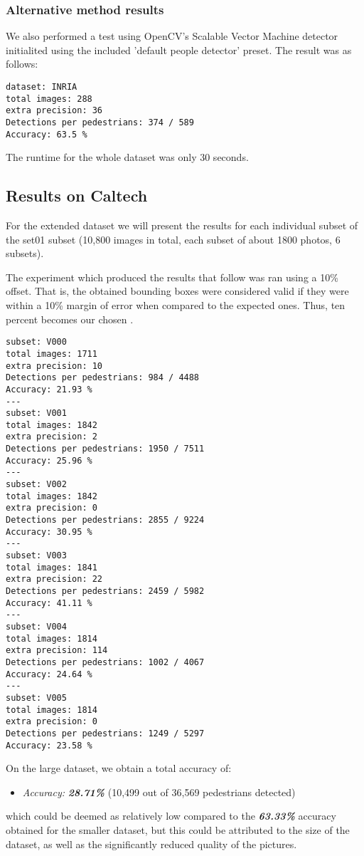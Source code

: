 \documentclass[runningheads,a4paper,11pt]{report}
\begin{document}
\subsubsection{Alternative method results}

We also performed a test using OpenCV's Scalable Vector Machine detector initialited using the included 'default people detector' preset. The result was as follows:

\begin{lstlisting}
dataset: INRIA
total images: 288
extra precision: 36
Detections per pedestrians: 374 / 589
Accuracy: 63.5 %
\end{lstlisting}

The runtime for the whole dataset was only 30 seconds.

\subsection{Results on Caltech}

For the extended dataset we will present the results for each individual subset of the set01 subset (10,800 images in total, each subset of about 1800 photos, 6 subsets).

The experiment which produced the results that follow was ran using a 10\% offset. That is, the obtained bounding boxes were considered valid if they were within a 10\% margin of error when compared to the expected ones. Thus, ten percent becomes our chosen .

\begin{lstlisting}
subset: V000
total images: 1711
extra precision: 10
Detections per pedestrians: 984 / 4488
Accuracy: 21.93 %
---
subset: V001
total images: 1842
extra precision: 2
Detections per pedestrians: 1950 / 7511
Accuracy: 25.96 %
---
subset: V002
total images: 1842
extra precision: 0
Detections per pedestrians: 2855 / 9224
Accuracy: 30.95 %
---
subset: V003
total images: 1841
extra precision: 22
Detections per pedestrians: 2459 / 5982
Accuracy: 41.11 %
---
subset: V004
total images: 1814
extra precision: 114
Detections per pedestrians: 1002 / 4067
Accuracy: 24.64 %
---
subset: V005
total images: 1814
extra precision: 0
Detections per pedestrians: 1249 / 5297
Accuracy: 23.58 %
\end{lstlisting}
On the large dataset, we obtain a total accuracy of:
\begin{itemize}
    \item \emph{Accuracy:} \textbf{\emph{28.71\%}} (10,499 out of 36,569 pedestrians detected)
\end{itemize}
 which could be deemed as relatively low compared to the \textbf{\emph{63.33\%}} accuracy obtained for the smaller dataset, but this could be attributed to the size of the dataset, as well as the significantly reduced quality of the pictures.
 
\end{document}
